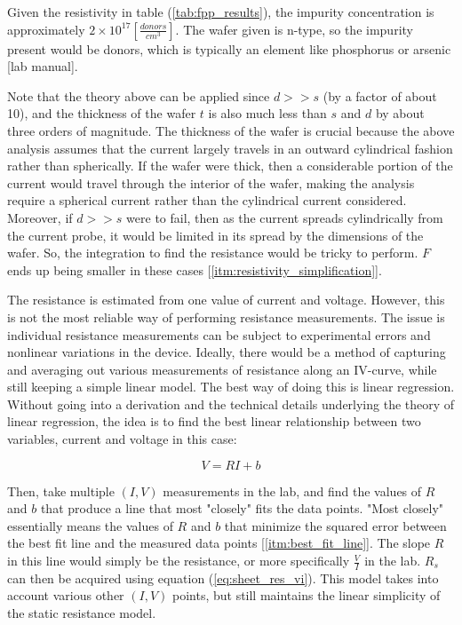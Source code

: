 \documentclass{article}
\begin{document}
\FloatBarrier

Given the resistivity in table (\ref{tab:fpp_results}), the impurity concentration is approximately $2 \times 10^{17} [\frac{donors}{cm^3}]$. The wafer given is n-type, so the impurity present would be donors, which is typically an element like phosphorus or arsenic [lab manual].

Note that the theory above can be applied since $d >> s$ (by a factor of about 10), and the thickness of the wafer $t$ is also much less than $s$ and $d$ by about three orders of magnitude. The thickness of the wafer is crucial because the above analysis assumes that the current largely travels in an outward cylindrical fashion rather than spherically. If the wafer were thick, then a considerable portion of the current would travel through the interior of the wafer, making the analysis require a spherical current rather than the cylindrical current considered. Moreover, if $d >> s$ were to fail, then as the current spreads cylindrically from the current probe, it would be limited in its spread by the dimensions of the wafer. So, the integration to find the resistance would be tricky to perform. $F$ ends up being smaller in these cases [\ref{itm:resistivity_simplification}]. %



The resistance is estimated from one value of current and voltage. However, this is not the most reliable way of performing resistance measurements. The issue is individual resistance measurements can be subject to experimental errors and nonlinear variations in the device.
Ideally, there would be a method of capturing and averaging out various measurements of resistance along an IV-curve, while still keeping a simple linear model. The best way of doing this is linear regression. Without going into a derivation and the technical details underlying the theory of linear regression, the idea is to find the best linear relationship between two variables, current and voltage in this case:

\begin{equation}
\label{eq:linear_reg}
V = RI + b
\end{equation}

Then, take multiple $(I,V)$ measurements in the lab, and find the values of $R$ and $b$ that produce a line that most "closely" fits the data points. "Most closely" essentially means the values of $R$ and $b$ that minimize the squared error between the best fit line and the measured data points [\ref{itm:best_fit_line}].
The slope $R$ in this line would simply be the resistance, or more specifically $\frac{V}{I}$ in the lab. $R_{s}$ can then be acquired using equation (\ref{eq:sheet_res_vi}). This model takes into account various other $(I,V)$ points, but still maintains the linear simplicity of the static resistance model.
\end{document}
